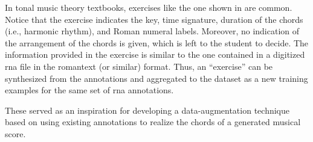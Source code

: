 
In tonal music theory textbooks, exercises like the one
shown in  are common. Notice that
the exercise indicates the key, time signature, duration of
the chords (i.e., harmonic rhythm), and Roman numeral
labels. Moreover, no indication of the arrangement of the
chords is given, which is left to the student to decide. The
information provided in the exercise is similar to the one
contained in a digitized \gls{rna} file in the
\gls{romantext} (or similar) format. Thus, an ``exercise''
can be synthesized from the annotations and aggregated to
the dataset as a new training examples for the same set of
\gls{rna} annotations.


These served as an inspiration for developing a
data-augmentation technique based on using existing
annotations to \gls{realize} the chords of a generated
musical score.
